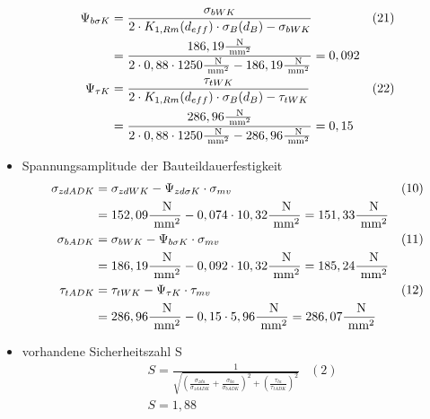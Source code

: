 \begin{itemize}
\begin{align*}
	\Psi_{b \sigma K}&= \frac{\sigma_{bWK}}{2 \cdot  K_{1,Rm} (d_{eff}) \cdot \sigma_B (d_B) -\sigma_{bWK}} &(21) \\
	&=  \frac{186,19 \frac{\text{ N}}{\text{ mm}^2}}{2 \cdot 0,88 \cdot 1250\frac{\text{ N}}{\text{ mm}^2} - 186,19 \frac{\text{ N}}{\text{ mm}^2}} = 0,092 \\
	\Psi_{\tau K}&= \frac{\tau_{tWK}}{2 \cdot  K_{1,Rm} (d_{eff}) \cdot \sigma_B (d_B) -\tau_{tWK}} &(22) \\
	&=  \frac{286,96 \frac{\text{ N}}{\text{ mm}^2}}{2 \cdot 0,88 \cdot 1250\frac{\text{ N}}{\text{ mm}^2} - 286,96 \frac{\text{ N}}{\text{ mm}^2}} = 0,15 
	\end{align*}
\item Spannungsamplitude der Bauteildauerfestigkeit
	\begin{align*}
	\sigma_{zdADK} &= \sigma_{zdWK} - \Psi_{zd \sigma K} \cdot \sigma_{mv} &(10) \\
	&= 152,09\frac{\text{ N}}{\text{ mm}^2} - 0,074 \cdot 10,32 \frac{\text{ N}}{\text{ mm}^2} = 151,33 \frac{\text{ N}}{\text{ mm}^2} \\
	\sigma_{bADK} &= \sigma_{bWK} - \Psi_{b \sigma K} \cdot \sigma_{mv} &(11) \\
	&= 186,19\frac{\text{ N}}{\text{ mm}^2} - 0,092 \cdot 10,32 \frac{\text{ N}}{\text{ mm}^2} = 185,24 \frac{\text{ N}}{\text{ mm}^2} \\
	\tau_{tADK} &= \tau_{tWK} - \Psi_{ \tau K} \cdot \tau_{mv} &(12) \\
	&= 286,96\frac{\text{ N}}{\text{ mm}^2} - 0,15 \cdot 5,96 \frac{\text{ N}}{\text{ mm}^2} = 286,07 \frac{\text{ N}}{\text{ mm}^2} 
	\end{align*}
\item vorhandene Sicherheitszahl S 
	\begin{align*}
		&S= \frac{1}{\sqrt{\left( \frac{\sigma_{zda}}{\sigma_{zdADK}} +\frac{\sigma_{ba}}{\sigma_{bADK}} \right)^2 +\left( \frac{\tau_{ta}}{\tau_{tADK}} \right)^2 }} &(2) \\
		&S=  1,88 
	\end{align*}
\end{itemize}

